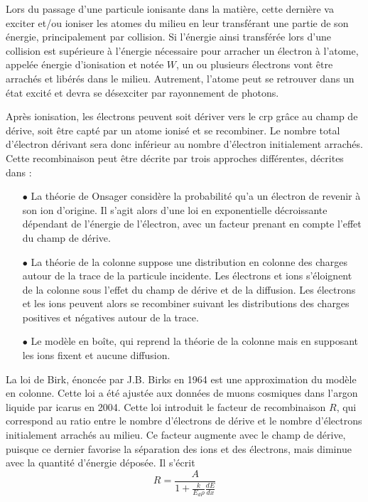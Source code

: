         Lors du passage d'une particule ionisante dans la matière, cette dernière va exciter et/ou ioniser les atomes du milieu en leur transférant une partie de son énergie, principalement par collision. Si l'énergie ainsi transférée lors d'une collision est supérieure à l'énergie nécessaire pour arracher un électron à l'atome, appelée énergie d'ionisation et notée $W$, un ou plusieurs électrons vont être arrachés et libérés dans le milieu. Autrement, l'atome peut se retrouver dans un état excité et devra se désexciter par rayonnement de photons. 

        Après ionisation, les électrons peuvent soit dériver vers le \gls{crp} grâce au champ de dérive, soit être capté par un atome ionisé et se recombiner. Le nombre total d'électron dérivant sera donc inférieur au nombre d'électron initialement arrachés. Cette recombinaison peut être décrite par trois approches différentes, décrites dans \cite{Amoruso2004}:
        \begin{itemize}
          \item[$\bullet$] La théorie de Onsager considère la probabilité qu'a un électron de revenir à son ion d'origine. Il s'agit alors d'une loi en exponentielle décroissante dépendant de l'énergie de l'électron, avec un facteur prenant en compte l'effet du champ de dérive.
          \item[$\bullet$] La théorie de la colonne suppose une distribution en colonne des charges autour de la trace de la particule incidente. Les électrons et ions s'éloignent de la colonne sous l'effet du champ de dérive et de la diffusion. Les électrons et les ions peuvent alors se recombiner suivant les distributions des charges positives et négatives autour de la trace.
          \item[$\bullet$] Le modèle en boîte, qui reprend la théorie de la colonne mais en supposant les ions fixent et aucune diffusion.
        \end{itemize}
        La loi de Birk, énoncée par J.B. Birks en 1964\cite{Birk1964} est une approximation du modèle en colonne. Cette loi a été ajustée aux données de muons cosmiques dans l'argon liquide par \gls{icarus} en 2004\cite{Amoruso2004}. Cette loi introduit le facteur de recombinaison $R$, qui correspond au ratio entre le nombre d'électrons de dérive et le nombre d'électrons initialement arrachés au milieu. Ce facteur augmente avec le champ de dérive, puisque ce dernier favorise la séparation des ions et des électrons, mais diminue avec la quantité d'énergie déposée. Il s'écrit
        \begin{equation}
          R=\frac{A}{1+\frac{k}{E_d \rho}\frac{dE}{dx}}\label{eq::R}
        \end{equation}
